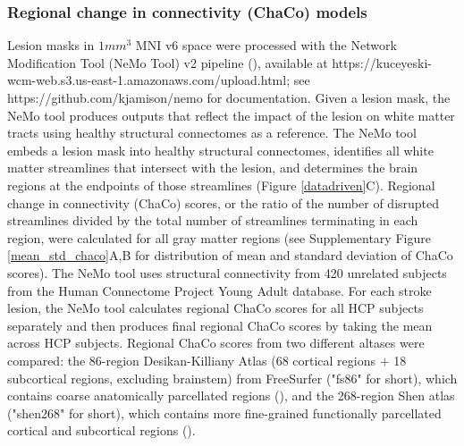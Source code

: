 \documentclass[10pt]{article}
\def\Plus{\texttt{+}}
\begin{document}
\subsubsection*{Regional change in connectivity (ChaCo) models}
Lesion masks in $1mm^3$ MNI v6 space were processed with the Network Modification Tool (NeMo Tool) v2 pipeline (\cite{Kuceyeski2013-nk}), available at https://kuceyeski-wcm-web.s3.us-east-1.amazonaws.com/upload.html; see https://github.com/kjamison/nemo for documentation. Given a lesion mask, the NeMo tool produces outputs that reflect the impact of the lesion on white matter tracts using healthy structural connectomes as a reference. The NeMo tool embeds a lesion mask into healthy structural connectomes, identifies all white matter streamlines that intersect with the lesion, and determines the brain regions at the endpoints of those streamlines (Figure \ref{datadriven}C). Regional change in connectivity (ChaCo) scores, or the ratio of the number of disrupted streamlines divided by the total number of streamlines terminating in each region, were calculated for all gray matter regions (see Supplementary Figure \ref{mean_std_chaco}A,B for distribution of mean and standard deviation of ChaCo scores). The NeMo tool uses structural connectivity from 420 unrelated subjects from the Human Connectome Project Young Adult database. For each stroke lesion, the NeMo tool calculates regional ChaCo scores for all HCP subjects separately and then produces final regional ChaCo scores by taking the mean across HCP subjects. Regional ChaCo scores from two different altases were compared: the 86-region Desikan-Killiany Atlas (68 cortical regions $\Plus$ 18 subcortical regions, excluding brainstem) from FreeSurfer ("fs86" for short), which contains coarse anatomically parcellated regions (\cite{Desikan2006-vf,Fischl2002-lb}), and the 268-region Shen atlas ("shen268" for short), which contains more fine-grained functionally parcellated cortical and subcortical regions (\cite{Shen2013-zn}).
\end{document}
